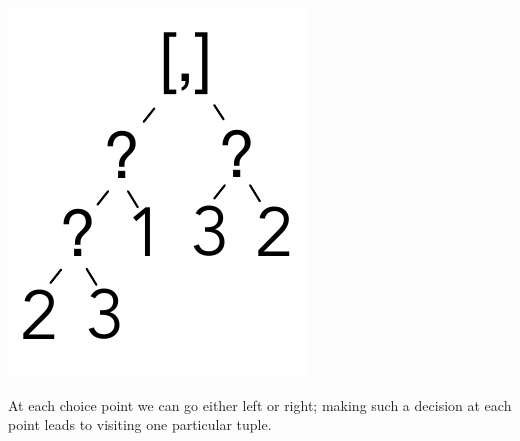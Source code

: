 \documentclass[a4paper,english]{lipics-v2019}
\begin{document}
\includegraphics[scale=.25]{figures/tree1.pdf}
\smallskip

\noindent
At each choice point we can go either left or right; making such a decision
at each point leads to visiting one particular tuple.
\end{document}
